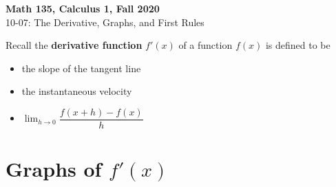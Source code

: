 \documentclass[11pt,reqno,final]{amsart}
\numberwithin{figure}{section}
\theoremstyle{definition} %
\newcommand{\dlim}{\displaystyle\lim}
\begin{document}


\begin{center}
        \textbf{\Large Math 135, Calculus 1, Fall 2020}\\[10pt]
        {\large 10-07: The Derivative, Graphs, and First Rules}
\end{center}

\thispagestyle{empty}


\renewcommand{\thesection}{\Alph{section}}


Recall the \textbf{derivative function} $f'(x)$ of a function $f(x)$ is defined to be
\begin{itemize}
\item the slope of the tangent line
\item the instantaneous velocity
\item $\dlim_{h \to 0}\dfrac{f(x+h) - f(x)}{h}$
\end{itemize}

\section{Graphs of $f'(x)$}
\end{document}
